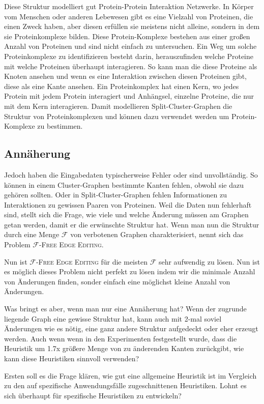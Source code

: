 \documentclass[12pt,a4paper,onecolumn,oneside,titlepage]{article}
\newcommand\cursive[1]{\ensuremath{\mathcal{#1}}}
\begin{document}
Diese Struktur modelliert gut Protein-Protein Interaktion Netzwerke. In Körper vom Menschen oder anderen Lebewesen gibt es eine Vielzahl von Proteinen, die einen Zweck haben, aber diesen erfüllen sie meistens nicht alleine, sondern in dem sie Proteinkomplexe bilden. Diese Protein-Komplexe bestehen aus einer großen Anzahl von Proteinen und sind nicht einfach zu untersuchen. Ein Weg um solche Proteinkomplexe zu identifizieren besteht darin, herauszufinden welche Proteine mit welche Proteinen überhaupt interagieren. So kann man die diese Proteine als Knoten ansehen und wenn es eine Interaktion zwischen diesen Proteinen gibt, diese als eine Kante ansehen. 
Ein Proteinkomplex hat einen Kern, wo jedes Protein mit jedem Protein interagiert und Anhängsel, einzelne Proteine, die nur mit dem Kern interagieren. Damit modellieren Split-Cluster-Graphen die Struktur von Proteinkomplexen und können dazu verwendet werden um Protein-Komplexe zu bestimmen.

\subsection{Annäherung}
Jedoch haben die Eingabedaten typischerweise Fehler oder sind unvollständig. So können in einem Cluster-Graphen bestimmte Kanten fehlen, obwohl sie dazu gehören sollten. Oder in Split-Cluster-Graphen fehlen Informationen zu Interaktionen zu gewissen Paaren von Proteinen. Weil die Daten nun fehlerhaft sind, stellt sich die Frage, wie viele und welche Änderung müssen am Graphen getan werden, damit er die erwünschte Struktur hat. Wenn man nun die Struktur durch eine Menge \cursive{F} von verbotenen Graphen charakterisiert, nennt sich das Problem \textsc{\cursive{F}-Free Edge Editing}.

Nun ist \textsc{\cursive{F}-Free Edge Editing} für die meisten \cursive{F} sehr aufwendig zu lösen. Nun ist es möglich dieses Problem nicht perfekt zu lösen indem wir die minimale Anzahl von Änderungen finden, sonder einfach eine möglichst kleine Anzahl von Änderungen.

Was bringt es aber, wenn man nur eine Annäherung hat? Wenn der zugrunde liegende Graph eine gewisse Struktur hat, kann auch mit 2-mal soviel Änderungen wie es nötig, eine ganz andere Struktur aufgedeckt oder eher erzeugt werden. Auch wenn wenn in den Experimenten festgestellt wurde, dass die Heuristik um 1.7x größere Menge von zu änderenden Kanten zurückgibt, wie kann diese Heuristiken sinnvoll verwenden?

Ersten soll es die Frage klären, wie gut eine allgemeine Heuristik ist im Vergleich zu den auf spezifische Anwendungsfälle zugeschnittenen Heuristiken. Lohnt es sich überhaupt für spezifische Heuristiken zu entwickeln? 
\end{document}
